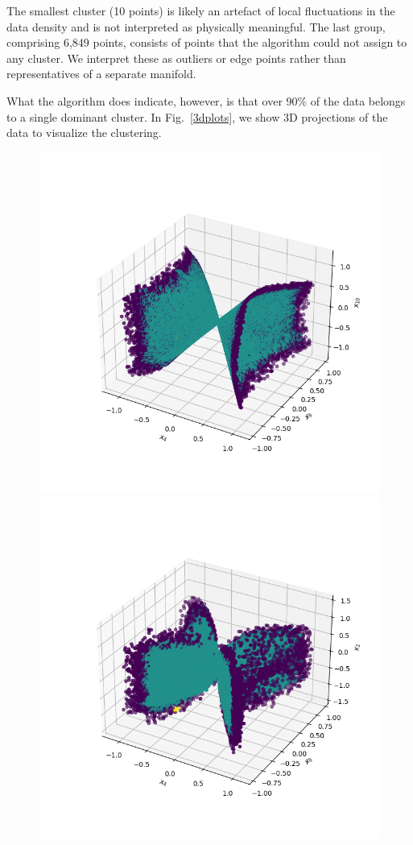 \documentclass[11pt]{article}
\begin{document}
		The smallest cluster (10 points) is likely an artefact of local fluctuations in the data density and is not interpreted as physically meaningful. The last group, comprising 6,849 points, consists of points that the algorithm could not assign to any cluster. We interpret these as outliers or edge points rather than representatives of a separate manifold.
		
		What the algorithm does indicate, however, is that over 90\% of the data belongs to a single dominant cluster. In Fig.~\ref{3dplots}, we show 3D projections of the data to visualize the clustering.
		
		\begin{figure}
			\centering
			\includegraphics[scale=0.4]{Figures/3d_plot_x4_x8_x10.png}
			\includegraphics[scale=0.4]{Figures/3d_plot_x2_x4_x8.png}

\end{figure}
\end{document}

